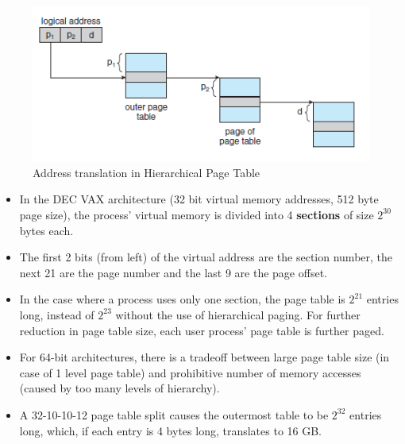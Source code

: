 \documentclass{article}
\theoremstyle{plain}
\theoremstyle{definition}
\begin{document}
\begin{figure}[!ht]
    \centering
    \includegraphics[scale=0.9]{os8.png}
    \caption{Address translation in Hierarchical Page Table}
    \label{fig:my_label_8}
\end{figure}

\begin{itemize}
    \item In the DEC VAX architecture (32 bit virtual memory addresses, 512 byte page size), the process' virtual memory is divided into 4 \textbf{sections} of size $2^{30}$ bytes each. 
    
    \item The first 2 bits (from left) of the virtual address are the section number, the next 21 are the page number and the last 9 are the page offset. 
    
    \item In the case where a process uses only one section, the page table is $2^{21}$ entries long, instead of $2^{23}$ without the use of hierarchical paging. For further reduction in page table size, each user process' page table is further paged.
    
    \item For 64-bit architectures, there is a tradeoff between large page table size (in case of 1 level page table) and prohibitive number of memory accesses (caused by too many levels of hierarchy). 
    
    \item A 32-10-10-12 page table split causes the outermost table to be $2^{32}$ entries long, which, if each entry is 4 bytes long, translates to 16 GB. 
\end{itemize}
\end{document}
